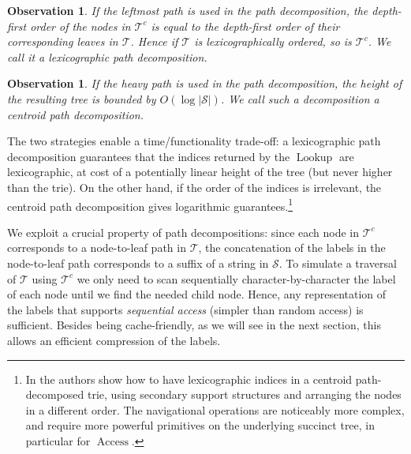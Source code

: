 \documentclass[a4paper,11pt]{article}
\newtheorem{observation}[theorem]{Observation}
\theoremstyle{nonumberplain}
\DeclareMathOperator{\Access}{Access}
\DeclareMathOperator{\Lookup}{Lookup}
\begin{document}
\begin{observation}
  If the leftmost path is used in the path decomposition, the
  depth-first order of the nodes in $\mathcal{T}^c$ is equal to the
  depth-first order of their corresponding leaves in
  $\mathcal{T}$. Hence if $\mathcal{T}$ is lexicographically ordered,
  so is $\mathcal{T}^c$. We call it a \emph{lexicographic path
    decomposition}.
\end{observation}

\begin{observation}
  \label{obs:centroid}
  If the heavy path is used in the path decomposition, the height of
  the resulting tree is bounded by $O(\log |\mathcal{S}|)$. We call
  such a decomposition a \emph{centroid path decomposition}.
\end{observation}

The two strategies enable a time/functionality trade-off: a
lexicographic path decomposition guarantees that the indices returned
by the $\Lookup$ are lexicographic, at cost of a potentially linear
height of the tree (but never higher than the  trie). On the
other hand, if the order of the indices is irrelevant, the centroid
path decomposition gives logarithmic guarantees.\footnote{In \cite{pods08} the authors show how to have
lexicographic indices in a centroid path-decomposed trie, using
secondary support structures and arranging the nodes in a different
order. The navigational operations are noticeably more
complex, and require more powerful primitives on the underlying
succinct tree, in particular for $\Access$.}

We exploit a crucial property of path decompositions: since each node
in $\mathcal{T}^c$ corresponds to a node-to-leaf path in
$\mathcal{T}$, the concatenation of the labels in the node-to-leaf
path corresponds to a suffix of a string in $\mathcal{S}$. To simulate
a traversal of $\mathcal{T}$ using $\mathcal{T}^c$ we only need to
scan sequentially character-by-character the label of each node until
we find the needed child node. Hence, any representation of the labels
that supports \emph{sequential access} (simpler than random access) is
sufficient. Besides being cache-friendly, as we will see in the next
section, this allows an efficient compression of the labels.
\end{document}
